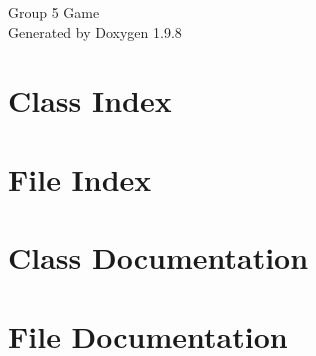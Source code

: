 \documentclass[twoside]{book}
\newcommand{\+}{\discretionary{\mbox{\scriptsize$\hookleftarrow$}}{}{}}
\newcommand{\clearemptydoublepage}{%
    \newpage{\pagestyle{empty}\cleardoublepage}%
  }
\begin{document}
  \raggedbottom
    \hypersetup{pageanchor=false,
                bookmarksnumbered=true,
                pdfencoding=unicode
               }
  \begin{titlepage}
  \vspace*{7cm}
  \begin{center}%
  {\Large Group 5 Game}\\
  \vspace*{1cm}
  {\large Generated by Doxygen 1.9.8}\\
  \end{center}
  \end{titlepage}
  \clearemptydoublepage
  \tableofcontents
  \clearemptydoublepage
  \hypersetup{pageanchor=true}
\chapter{Class Index}

\chapter{File Index}

\chapter{Class Documentation}










\chapter{File Documentation}



  \backmatter
  \newpage
  \clearemptydoublepage
  \printindex
\end{document}
